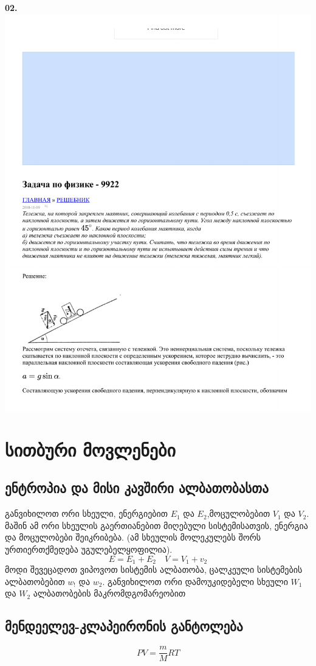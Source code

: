\documentclass[a4paper]{book}
\begin{document}
\textbf{02.}
\includegraphics[width=0.9\columnwidth]{temp_pdfs/2.pdf}

\chapter{სითბური მოვლენები}
\section{ენტროპია და მისი კავშირი ალბათობასთა}
განვიხილოთ ორი სხეული, ენერგიებით $E_1$ და $E_2$,მოცულობებით $V_1$ და $V_2$. მაშინ ამ ორი სხეულის გაერთიანებით მიღებული სისტემისათვის, ენერგია და მოცულობები შეიკრიბება. (ამ სხეულის მოლეკულებს შორს ურთიერთქმედება უგულებელყოფილია).
$$E = E_1 + E_2 \quad V = V_1 + v_2$$
მოდი შევეცადოთ ვიპოვოთ სისტემის ალბათობა, ცალკეული სისტემების ალბათობებით $w_!$ და $w_2$. განვიხილოთ ორი დამოუკიდებელი სხეული $W_1$ და $W_2$ ალბათობების მაკრომდგომარეობით

\section{მენდეელევ-კლაპეირონის განტოლება}
$$PV = \frac{m}{M}RT$$
\end{document}
